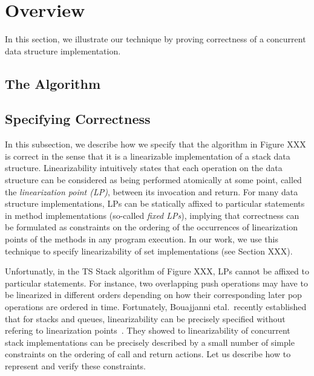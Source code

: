 \section{Overview}
\label{sec:overview}

In this section, we illustrate our technique by proving correctness of
a concurrent data structure implementation.

\subsection{The Algorithm}





\subsection{Specifying Correctness}
In this subsection, we describe how we specify that the algorithm in Figure XXX
is correct in the sense that it is a linearizable implementation of a
stack data structure. Linearizability intuitively states that
each operation on the data structure can be considered as being
performed atomically at some point, called the {\em linearization point (LP)},
between its invocation and return.
For many data structure implementations, LPs can be statically
affixed to particular statements in method implementations (so-called
{\em fixed LPs}),
implying that correctness can be formulated as constraints on the ordering of the
occurrences of linearization points of the methods in any program
execution.
In our work, we use this technique to specify linearizability of
set implementations (see Section XXX).

Unfortunatly, in the TS Stack algorithm of Figure XXX, LPs cannot be affixed
to particular statements. For instance,  two overlapping
push operations may have to be linearized in different orders depending
on how their corresponding later pop operations are ordered in time.
Fortunately, Bouajjanni etal.\ recently established that for stacks and
queues, linearizability can be precisely specified without refering to
linearization points~\cite{BEEH:icalp15}. They showed to linearizability
of concurrent stack implementations can be precisely described by
a small number of simple 
constraints on the ordering of call and return actions.
Let us describe how to represent and verify these constraints.

